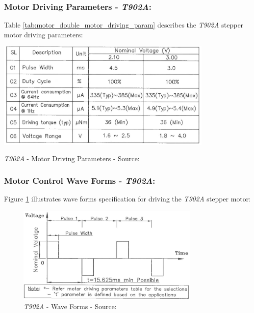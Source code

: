 \documentclass[report.tex]{subfiles}
\begin{document}
\pagebreak
\subsubsection{Motor Driving Parameters - \textit{T902A}:}

Table \ref{tab:motor_double_motor_driving_param} describes the \textit{T902A} stepper motor driving parameters: 

\begin{table}[H]
	\centering
	\includegraphics[width=0.8\textwidth]{Include/Figure/comp/motor_double_motor_driving_param.png}
	\caption{\textit{T902A} - Motor Driving Parameters - Source: \cite{motor2}}
	\label{tab:motor_double_motor_driving_param}
\end{table}

\subsubsection{Motor Control Wave Forms - \textit{T902A}:}

Figure \ref{fig:motor_double_wave_form} illustrates wave forms specification for driving the \textit{T902A} stepper motor: 

\begin{figure}[H]
	\centering
	\includegraphics[width=0.8\textwidth]{Include/Figure/comp/motor_double_wave_form.png}
	\caption{\textit{T902A} - Wave Forms - Source: \cite{motor2}}
	\label{fig:motor_double_wave_form}
\end{figure}
\end{document}
